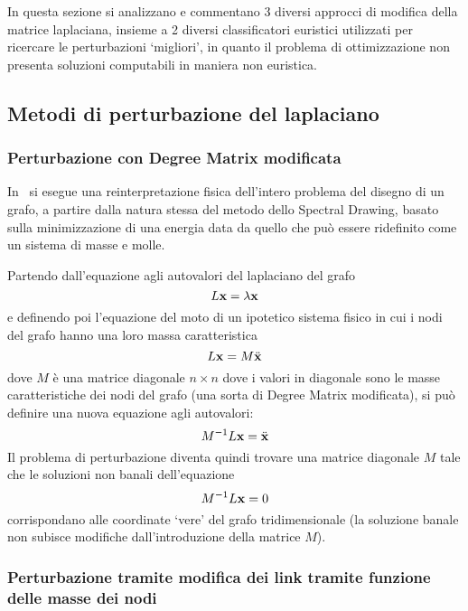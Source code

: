 \documentclass[10pt,a4paper]{article}
\begin{document}
In questa sezione si analizzano e commentano 3 diversi approcci di modifica della matrice laplaciana, insieme a 2 diversi classificatori euristici utilizzati per ricercare le perturbazioni `migliori', in quanto il problema di ottimizzazione non presenta soluzioni computabili in maniera non euristica.

\subsection{Metodi di perturbazione del laplaciano}

\subsubsection{Perturbazione con Degree Matrix modificata}\label{subsec:sofia}

In~\cite{tesi_sofia_farina} si esegue una reinterpretazione fisica dell'intero problema del disegno di un grafo, a partire dalla natura stessa del metodo dello Spectral Drawing, basato sulla minimizzazione di una energia data da quello che può essere ridefinito come un sistema di masse e molle.

Partendo dall'equazione agli autovalori del laplaciano del grafo
\begin{equation}
    L\vb{x} = \lambda\vb{x}
\end{equation}
e definendo poi l'equazione del moto di un ipotetico sistema fisico in cui i nodi del grafo hanno una loro massa caratteristica
\begin{equation}
    L\vb{x} = M \ddot{\vb{x}}
\end{equation}
dove \(M\) è una matrice diagonale \(n\times n\) dove i valori in diagonale sono le masse caratteristiche dei nodi del grafo (una sorta di Degree Matrix modificata), si può definire una nuova equazione agli autovalori:
\begin{equation}
    M^{-1}L\vb{x} = \ddot{\vb{x}}
\end{equation}
Il problema di perturbazione diventa quindi trovare una matrice diagonale \(M\) tale che le soluzioni non banali dell'equazione
\begin{equation}
    M^{-1}L\vb{x} = 0
\end{equation}
corrispondano alle coordinate `vere' del grafo tridimensionale (la soluzione banale non subisce modifiche dall'introduzione della matrice \(M\)).

\subsubsection{Perturbazione tramite modifica dei link tramite funzione delle masse dei nodi}
\end{document}
